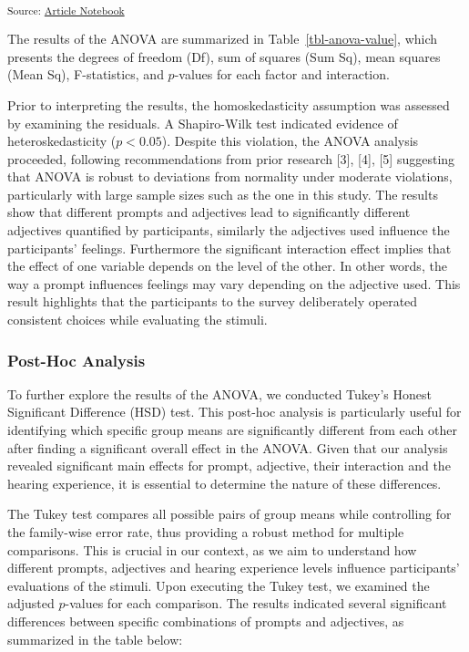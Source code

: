 \documentclass[
  letterpaper,
  DIV=11,
  numbers=noendperiod]{scrartcl}
\begin{document}
\textsubscript{Source:
\href{https://matteospanio.github.io/multimodal-symphony-survey-analysis/index.qmd.html}{Article
Notebook}}

The results of the ANOVA are summarized in Table~\ref{tbl-anova-value},
which presents the degrees of freedom (Df), sum of squares (Sum Sq),
mean squares (Mean Sq), F-statistics, and \(p\)-values for each factor
and interaction.

Prior to interpreting the results, the homoskedasticity assumption was
assessed by examining the residuals. A Shapiro-Wilk test indicated
evidence of heteroskedasticity (\(p < 0.05\)). Despite this violation,
the ANOVA analysis proceeded, following recommendations from prior
research {[}3{]}, {[}4{]}, {[}5{]} suggesting that ANOVA is robust to
deviations from normality under moderate violations, particularly with
large sample sizes such as the one in this study. The results show that
different prompts and adjectives lead to significantly different
adjectives quantified by participants, similarly the adjectives used
influence the participants' feelings. Furthermore the significant
interaction effect implies that the effect of one variable depends on
the level of the other. In other words, the way a prompt influences
feelings may vary depending on the adjective used. This result
highlights that the participants to the survey deliberately operated
consistent choices while evaluating the stimuli.

\subsubsection{Post-Hoc Analysis}\label{post-hoc-analysis}

To further explore the results of the ANOVA, we conducted Tukey's Honest
Significant Difference (HSD) test. This post-hoc analysis is
particularly useful for identifying which specific group means are
significantly different from each other after finding a significant
overall effect in the ANOVA. Given that our analysis revealed
significant main effects for prompt, adjective, their interaction and
the hearing experience, it is essential to determine the nature of these
differences.

The Tukey test compares all possible pairs of group means while
controlling for the family-wise error rate, thus providing a robust
method for multiple comparisons. This is crucial in our context, as we
aim to understand how different prompts, adjectives and hearing
experience levels influence participants' evaluations of the stimuli.
Upon executing the Tukey test, we examined the adjusted \(p\)-values for
each comparison. The results indicated several significant differences
between specific combinations of prompts and adjectives, as summarized
in the table below:
\end{document}
